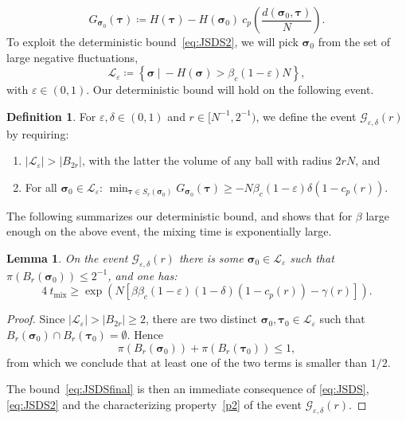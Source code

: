 \documentclass[letterpaper, DIV=17]{scrartcl}
\newtheorem{lemma}[theorem]{Lemma}
\numberwithin{equation}{section}
\theoremstyle{definition}
\newtheorem{defn}{Definition}[section]
\newcommand{\btau}{\boldsymbol{\tau} }
\newcommand{\bsig}{\boldsymbol{\sigma} }
\begin{document}
\begin{equation}\label{eq:Gdec}
   G_{\bsig_0}(\btau) \coloneqq  H(\btau) -  H(\bsig_0) \ c_p\left( \frac{d(\bsig_0,\btau)}{N}\right)  . 
\end{equation}
To exploit the deterministic bound~\eqref{eq:JSDS2}, we 
will pick $ \bsig_0$ from the set of large negative fluctuations,
\begin{equation}\label{def:L}
    \mathcal{L}_{\varepsilon} \coloneq \left\{ \bsig \ | \ - H(\bsig) > \beta_c (1- \varepsilon) N \right\} , 
\end{equation}
with $  \varepsilon \in (0,1) $. 
Our deterministic bound will hold on the following event.
%
\begin{defn}\label{def:G}
For $ \varepsilon , \delta  \in (0,1)$ and $ r \in [N^{-1}, 2^{-1}) $, we define the event $ \mathcal{G}_{\varepsilon , \delta}(r) $ by requiring:
\begin{enumerate}
    \item $ | \mathcal{L}_\varepsilon | > | B_{2r} | $, with the latter the volume of any ball with radius $ 2 r N $, and
    \item\label{p2} For all $ \bsig_0 \in \mathcal{L}_\varepsilon  $: \quad $ \displaystyle \min_{\btau \in S_r(\bsig_0)} G_{\bsig_0}(\btau) \geq -N \beta_c (1-\varepsilon) \delta (1-c_p(r) ) $. 
\end{enumerate}
\end{defn}
The following summarizes our deterministic bound, and shows that for $ \beta $ large enough on the above event, the mixing time is exponentially large. 
%
\begin{lemma}\label{lem:bottlesum}
On the event $ \mathcal{G}_{\varepsilon , \delta}(r) $ there is some $ \bsig_0 \in \mathcal{L}_\varepsilon $ such that $ \pi\left( B_r(\bsig_0) \right)\leq 2^{-1} $, and one has:
\begin{equation}\label{eq:JSDSfinal}
 4 \  t_{\textrm{mix}} \geq \exp\left( N \left[ \beta  \beta_c (1-\varepsilon) (1-\delta)(1-c_p(r) )  - \gamma(r) \right]\right) . 
\end{equation}  
\end{lemma}
\begin{proof}
Since $| \mathcal{L}_\varepsilon | > |B_{2r}| \geq 2 $, there are two distinct $ \bsig_0 , \btau_0 \in \mathcal{L}_\varepsilon $ such that $ B_r(\bsig_0) \cap B_r(\btau_0) = \emptyset$. Hence
$$
\pi(B_r(\bsig_0) ) + \pi(B_r(\btau_0)) \leq 1 ,
$$
from which we conclude that at least one of the two terms is smaller than $ 1/2$. 

The bound~\eqref{eq:JSDSfinal} is then an immediate consequence of \eqref{eq:JSDS}, \eqref{eq:JSDS2} and the characterizing property~\ref{p2} of the event $\mathcal{G}_{\varepsilon , \delta}(r) $. 
\end{proof}
\end{document}
